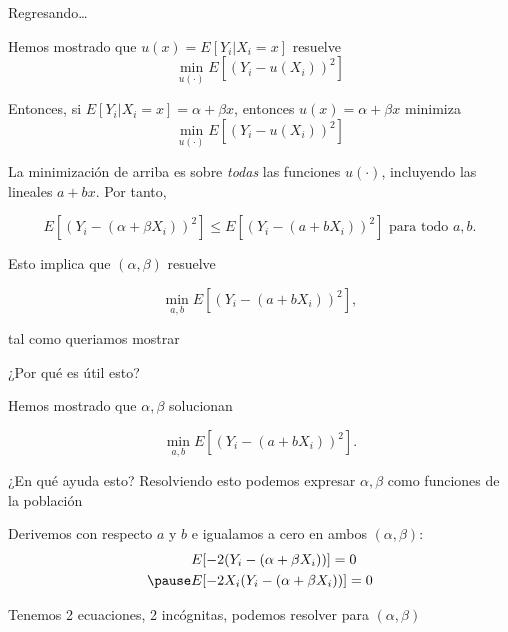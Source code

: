 \documentclass[11pt,handout,aspectratio=169]{beamer}
\newenvironment{wideitemize}{\itemize\addtolength{\itemsep}{10pt}}{\enditemize}
\begin{document}
\begin{frame}{Regresando\dots}
	
\begin{wideitemize}

\item
Hemos mostrado que $u(x) = E[Y_i | X_i = x]$ resuelve
$$\min_{u(\cdot)} E[ (Y_i - u(X_i))^2  ]$$

\pause
\item
Entonces, si $E[Y_i | X_i = x] = \alpha + \beta x$, entonces $u(x) = \alpha + \beta x$ minimiza  
$$\min_{u(\cdot)} E[ (Y_i - u(X_i))^2  ]$$

\pause
\item
La minimización de arriba es sobre \textit{todas} las funciones $u(\cdot)$, incluyendo las lineales $a + b x$. Por tanto, 

$$ E[ (Y_i -  (\alpha + \beta X_i)  )^2  ] \leq  E[ (Y_i -  (a + b X_i)  )^2  ]  \text{ para todo } a ,b. $$

\pause
\item
Esto implica que $(\alpha,\beta)$ resuelve

$$\min_{a,b}E[ (Y_i -  (a+ b X_i)  )^2  ] ,$$

\noindent tal como queriamos mostrar
\end{wideitemize}	
\end{frame}


\begin{frame}{¿Por qué es útil esto?}
\begin{wideitemize}

\item
Hemos mostrado que $\alpha,\beta$ solucionan 

$$\min_{a,b}E[ (Y_i -  (a+ b X_i)  )^2  ] .$$

\item 
¿En qué ayuda esto? \pause Resolviendo esto podemos expresar $\alpha,\beta$ como funciones de la población 

\pause
\item
Derivemos con respecto  $a$ y $b$ e igualamos a cero en ambos $(\alpha,\beta)$: \pause
\begin{align*}
& E[-2  (Y_i - (\alpha + \beta X_i )) ] = 0 \\ \pause
& E[-2  X_i (Y_i -(\alpha + \beta X_i)) ] = 0
\end{align*}

\pause
\item
Tenemos 2 ecuaciones, 2 incógnitas, podemos resolver para $(\alpha,\beta)$

\end{wideitemize}
\end{frame}
\end{document}
